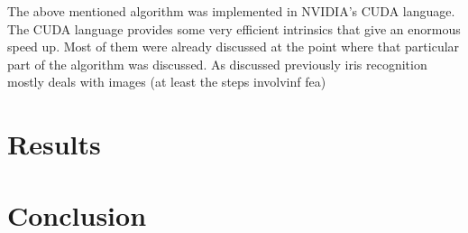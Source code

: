\documentclass[journal]{IEEEtran}
\begin{document}
The above mentioned algorithm was implemented in NVIDIA's CUDA language. The CUDA language provides some very efficient intrinsics that give an enormous speed up. Most of them were already discussed at the point where that particular part of the algorithm was discussed. As discussed previously iris recognition mostly deals with images (at least the steps involvinf fea)

\section{Results}
\lipsum[3]

\section{Conclusion}
\lipsum[3]

 

 
\end{document}
